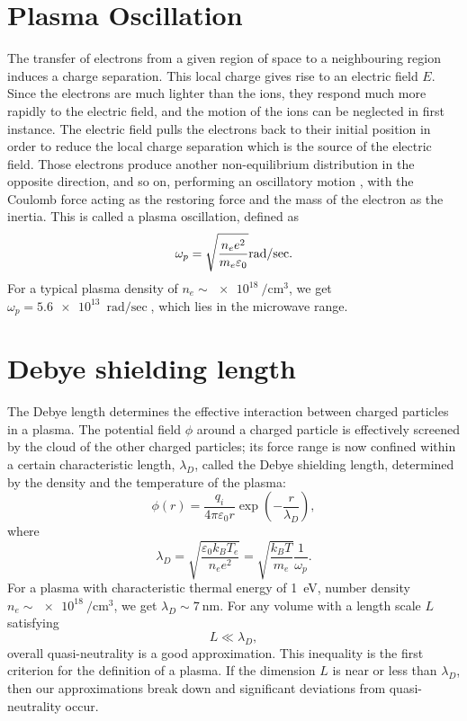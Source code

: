 \documentclass[justified,nofonts,nobib,openany]{tufte-book}
\begin{document}
\section{Plasma Oscillation}\label{sec:oscillation}
The transfer of electrons from a given region of space to a neighbouring region induces a charge separation. This local charge gives rise to an electric field $E$. Since the electrons are much lighter than the ions, they respond much more rapidly to the electric field, and the motion of the ions can be neglected in first instance. The electric field pulls the electrons back to their initial position in order to reduce the local charge separation which is the source of the electric field. Those electrons produce another non-equilibrium distribution in the opposite direction, and so on, performing an oscillatory motion , with the Coulomb force acting as the restoring force and the mass of the electron as the inertia. This is called a plasma oscillation, defined as
\begin{equation}
		\omega_p=\sqrt{\frac{n_e e^2}{m_e \varepsilon_0}}\si[per-mode=fraction]{\radian\per\sec}.\label{eq:plasma-frequency}
\end{equation}
For a typical plasma density of $n_e \sim \SI{e18}{\per\cubic\cm}$, we get $\omega_p=\SI{5.6e13}{\radian\per\sec}$, which lies in the microwave range.

\section{Debye shielding length}\label{sec:debye}
The Debye length determines the effective interaction between charged particles in a plasma. The potential field $\phi$ around a charged particle is effectively screened by the cloud of the other charged particles; its force range is now confined within a certain characteristic length, $\lambda_D$, called the Debye shielding length, determined by the density and the temperature of the plasma:
\begin{equation}
\phi(r)=\frac{q_i}{4\pi\varepsilon_0 r}\exp{\left(-\frac{r}{\lambda_D}\right)},
\end{equation}
where
\begin{equation}
\lambda_D=\sqrt{\frac{\varepsilon_0 k_B T_e}{n_e e^2}}=\sqrt{\frac{k_B T}{m_e}}\frac{1}{\omega_p}.
\end{equation}
For a plasma with characteristic thermal energy of \SI{1}{\electronvolt}, number density $n_e \sim \SI{e18}{\per\cubic\cm}$, we get $\lambda_D \sim \SI{7}{\nm}$.
For any volume with a length scale $L$ satisfying 
\begin{equation}
L \ll \lambda_D,
\end{equation}
overall quasi-neutrality is a good approximation. This inequality is the first criterion for the definition of a plasma. If the dimension $L$ is near or less than $\lambda_D$, then our approximations break down and significant deviations from quasi-neutrality occur.
\end{document}
